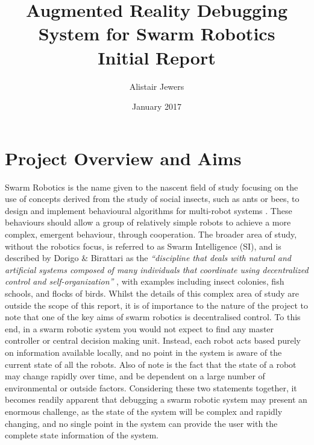 \documentclass[titlepage,hidelinks,10pt]{article}
\date{January 2017}
\title{Augmented Reality Debugging System for Swarm Robotics \vspace{1cm}\\\Large{Initial Report}}
\author{Alistair Jewers}
\begin{document}
\maketitle

\tableofcontents
\newpage

\section{Project Overview and Aims} \label{Overview}
Swarm Robotics is the name given to the nascent field of study focusing on the use of concepts derived from the study of social insects, such as ants or bees, to design and implement behavioural algorithms for multi-robot systems \cite{InspirationToApplication}. These behaviours should allow a group of relatively simple robots to achieve a more complex, emergent behaviour, through cooperation. The broader area of study, without the robotics focus, is referred to as Swarm Intelligence (SI), and is described by Dorigo \& Birattari as the \textit{``discipline that deals with natural and artificial systems composed of many individuals that coordinate using decentralized control and self-organization''} \cite{SwarmIntelligence}, with examples including insect colonies, fish schools, and flocks of birds. Whilst the details of this complex area of study are outside the scope of this report, it is of importance to the nature of the project to note that one of the key aims of swarm robotics is decentralised control. To this end, in a swarm robotic system you would not expect to find any master controller or central decision making unit. Instead, each robot acts based purely on information available locally, and no point in the system is aware of the current state of all the robots. Also of note is the fact that the state of a robot may change rapidly over time, and be dependent on a large number of environmental or outside factors. Considering these two statements together, it becomes readily apparent that debugging a swarm robotic system may present an enormous challenge, as the state of the system will be complex and rapidly changing, and no single point in the system can provide the user with the complete state information of the system. 
\end{document}
